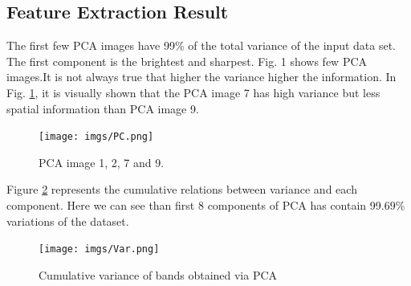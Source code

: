 \documentclass[document.tex]{subfiles}
\begin{document}
\subsection{Feature Extraction Result}
The first few PCA images  have 99\% of the total variance of the input data set. The first component is the brightest and sharpest.
Fig. 1 shows few PCA images.It is not always true that higher the variance higher the information. In Fig. \ref{fig:Some principal components}, it is visually shown that the PCA image 7 has high variance but less spatial information than PCA image 9. 
\begin{figure}[H]
	\begin{center}
		\texttt{[image: imgs/PC.png]}
	\end{center}
	\caption{PCA image 1, 2, 7 and 9.}
	\label{fig:Some principal components}
\end{figure}
\noindent Figure \ref{fig:Cumulative variance of bands obtained via PCA} represents the cumulative relations between variance and each component. Here we can see than first 8 components of PCA has contain 99.69\% variations of the dataset.
\begin{figure}[H]
	\begin{center}
		\texttt{[image: imgs/Var.png]}
	\end{center}
	\caption{Cumulative variance of bands obtained via PCA}
	\label{fig:Cumulative variance of bands obtained via PCA}
\end{figure}
\end{document}
